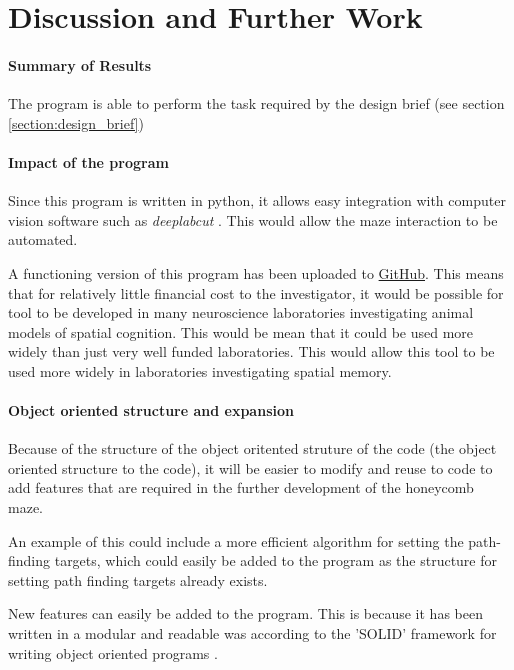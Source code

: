 \section{Discussion and Further Work}

\paragraph{Summary of Results}

The program is able to perform the task required by the design brief (see section \ref{section:design_brief})

\paragraph{Impact of the program}

Since this program is written in python, it allows easy integration with computer vision software such as \textit{deeplabcut} \cite{dlc}. This would allow the maze interaction to be automated.

A functioning version of this program has been uploaded to \href{https://github.com/casualcoffeeaddict/Honeycomb-Maze}{GitHub}. This means that for relatively little financial cost to the investigator, it would be possible for tool to be developed in many neuroscience laboratories investigating animal models of spatial cognition. This would be mean that it could be used more widely than just very well funded laboratories.
This would allow this tool to be used more widely in laboratories investigating spatial memory.  

\paragraph{Object oriented structure and expansion}

Because of the structure of the object oritented struture of the code (the object oriented structure to the code), it will be easier to modify and reuse to code to add features that are required in the further development of the honeycomb maze. 

An example of this could include a more efficient algorithm for setting the path-finding targets, which could easily be added to the program as the structure for setting path finding targets already exists.

New features can easily be added to the program. This is because it has been written in a modular and readable was according to the 'SOLID' framework for writing object oriented programs \cite{SOLID_book}.



